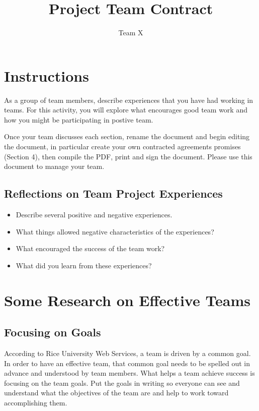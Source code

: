 \documentclass{article}\usepackage[]{graphicx}\usepackage[]{color}
\title{Project Team Contract}
\author{Team X}
\begin{document}
\maketitle

\section{Instructions}

As a group of team members, describe experiences that you have had working in teams. For this activity, you will explore what encourages good team work and how you might be participating in postive team.

Once your team discusses each section, rename the document and begin editing the document, in particular create your own contracted agreements promises (Section 4), then compile the PDF, print and sign the document. Please use this document to manage your team.

\subsection{Reflections on Team Project Experiences}

\begin{itemize}
  \item Describe several positive and negative experiences.
  \item What things allowed negative characteristics of the experiences?
  \item What encouraged the success of the team work?
  \item What did you learn from these experiences?
\end{itemize}

\section{Some Research on Effective Teams}
\subsection{Focusing on Goals}

According to Rice University Web Services, a team is driven by a common goal. In order to have an effective team, that common goal needs to be spelled out in advance and understood by team members. What helps a team achieve success is focusing on the team goals. Put the goals in writing so everyone can see and understand what the objectives of the team are and help to work toward accomplishing them.
\end{document}
